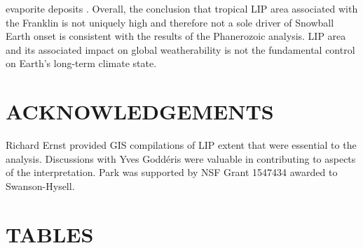 \documentclass[11pt,letterpaper]{article}
\begin{document}
evaporite deposits \citep{Macdonald2017a}. Overall, the conclusion that tropical LIP area associated with the Franklin is not uniquely high and therefore not a sole driver of Snowball Earth onset is consistent with the results of the Phanerozoic analysis. LIP area and its associated impact on global weatherability is not the fundamental control on Earth's long-term climate state.

\section*{ACKNOWLEDGEMENTS \label{sec:ACKNOWLEDGEMENTS}}

Richard Ernst provided GIS compilations of LIP extent that were essential to the analysis. Discussions with Yves Godd\'eris were valuable in contributing to aspects of the interpretation. Park was supported by NSF Grant 1547434 awarded to Swanson-Hysell.

\clearpage
\newpage

\section*{TABLES}
\end{document}
